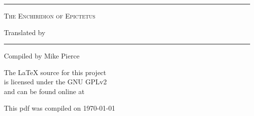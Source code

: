 
\begin{titlepage}
\begin{center}

    \vspace*{\baselineskip}
    \noindent
        \rule{\textwidth}{1pt}

    \noindent
        \textsc{\LARGE{The Enchiridion of Epictetus}}

    \noindent
        Translated by \AuthorFull

    \noindent
        \rule{\textwidth}{1pt}

    \vfill

    \noindent
        \footnotesize{%
            Compiled by Mike Pierce \\%
            \email{} %
        }

    \vspace*{.5in}\noindent
        \footnotesize{%
            The \LaTeX{} source for this project \\%
            is licensed under the GNU GPLv2 \\%
            and can be found online at \\%
            \github{} %
        }

    \vspace*{1in}\noindent
        \tiny{%
            This pdf was compiled on \today %
        }

\end{center}
\end{titlepage}




